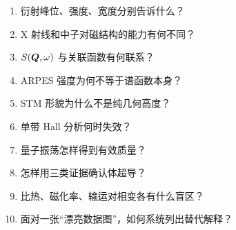 \begin{selftestbox}
\begin{enumerate}
\item 衍射峰位、强度、宽度分别告诉什么？
\item X 射线和中子对磁结构的能力有何不同？
\item $S(\bm{Q},\omega)$ 与关联函数有何联系？
\item ARPES 强度为何不等于谱函数本身？
\item STM 形貌为什么不是纯几何高度？
\item 单带 Hall 分析何时失效？
\item 量子振荡怎样得到有效质量？
\item 怎样用三类证据确认体超导？
\item 比热、磁化率、输运对相变各有什么盲区？
\item 面对一张“漂亮数据图”，如何系统列出替代解释？
\end{enumerate}
\end{selftestbox}

